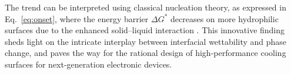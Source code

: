 The trend can be interpreted using classical nucleation theory, as expressed in Eq.~\eqref{eq:onset}, where the energy barrier $\Delta G^*$ decreases on more hydrophilic surfaces due to the enhanced solid--liquid interaction \cite{carey2018}. This innovative finding sheds light on the intricate interplay between interfacial wettability and phase change, and paves the way for the rational design of high-performance cooling surfaces for next-generation electronic devices.
